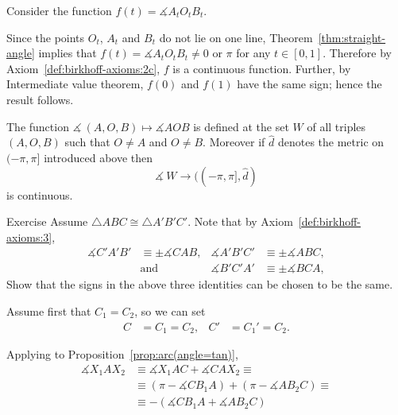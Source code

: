 {Consider the function 
$f(t)=\measuredangle A_tO_tB_t$.

Since 
the points $O_t$, $A_t$ and $B_t$ do not lie on one line,
Theorem~\ref{thm:straight-angle} implies that $f(t)=\measuredangle A_tO_tB_t\ne 0$ or $\pi$ for any $t\in[0,1]$.
Therefore by Axiom~\ref{def:birkhoff-axioms:2c},
$f$ is a continuous function.
Further,
by Intermediate value theorem, $f(0)$ and $f(1)$ have the same sign;
hence the result follows.
\qeds








\item\label{def:birkhoff-axioms:2c} 
The function $\measuredangle\:(A,O,B)\mapsto\measuredangle A O B$
is defined at the set $W$ of all triples 
$(A,O,B)$ such that $O\ne A$ and $O\ne B$.
Moreover if $\hat{d}$ denotes the metric on $(-\pi,\pi]$ introduced above then
$$\measuredangle\: W\to ((-\pi,\pi],\hat{d})$$ 
is continuous.









\begin{thm}{Exercise}\label{ex:angle-signs-in-trig}
Assume $\triangle ABC\cong\triangle A'B'C'$. 
Note that by Axiom~\ref{def:birkhoff-axioms:3},
\begin{align*}
\measuredangle C'A'B'&\equiv\pm\measuredangle CAB,
&
\measuredangle A'B'C'&\equiv\pm\measuredangle ABC,
\\
&\text{and}&\measuredangle B'C'A'&\equiv\pm\measuredangle BCA,
\end{align*}
Show that the signs in the above three identities can be chosen
to be the same. 
\end{thm}









Assume first that $C_1=C_2$, so we can set 
\begin{align*}
C&=C_1=C_2,
&
C'&=C_1'=C_2.
\end{align*}


Applying to Proposition~\ref{prop:arc(angle=tan)},
\begin{align*}
\measuredangle X_1AX_2&\equiv\measuredangle X_1AC+\measuredangle CAX_2\equiv
\\
&\equiv(\pi-\measuredangle CB_1A)+(\pi-\measuredangle AB_2 C)\equiv
\\
&
\equiv -(\measuredangle CB_1A+\measuredangle AB_2 C)
\end{align*}

}
